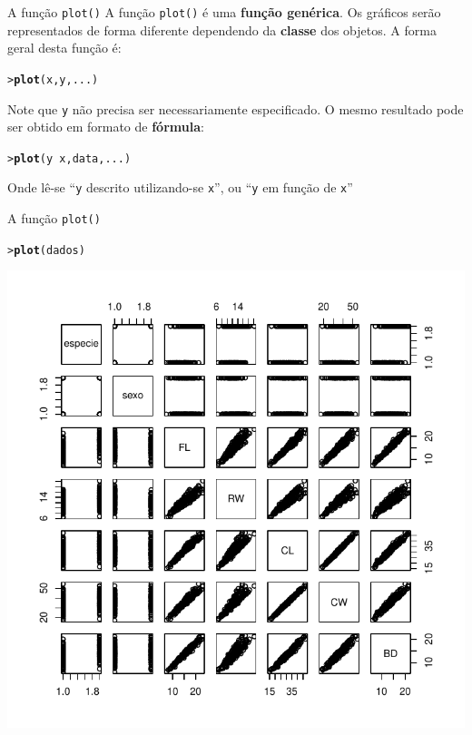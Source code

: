 \documentclass[10pt]{beamer}\usepackage[]{graphicx}\usepackage[]{color}
\makeatletter
\newcommand{\hlopt}[1]{\textcolor[rgb]{0,0,0}{#1}}%
\newcommand{\hlstd}[1]{\textcolor[rgb]{0.345,0.345,0.345}{#1}}%
\newcommand{\hlkwd}[1]{\textcolor[rgb]{0.282,0.239,0.545}{\textbf{#1}}}%
\newenvironment{kframe}{%
 \def\at@end@of@kframe{}%
 \ifinner\ifhmode%
  \def\at@end@of@kframe{\end{minipage}}%
  \begin{minipage}{\columnwidth}%
 \fi\fi%
 \def\FrameCommand##1{\hskip\@totalleftmargin \hskip-\fboxsep
 \colorbox{shadecolor}{##1}\hskip-\fboxsep
     \hskip-\linewidth \hskip-\@totalleftmargin \hskip\columnwidth}%
 \MakeFramed {\advance\hsize-\width
   \@totalleftmargin\z@ \linewidth\hsize
   \@setminipage}}%
 {\par\unskip\endMakeFramed%
 \at@end@of@kframe}
\newenvironment{knitrout}{}{} %
\makeatother
\begin{document}
\begin{frame}[fragile=singleslide]{A função \texttt{plot()}}
A função \texttt{plot()} é uma \textbf{função genérica}. Os gráficos serão
representados de forma diferente dependendo da \textbf{classe} dos
objetos. A forma geral desta função é:
\begin{knitrout}\small
{}\color{fgcolor}\begin{kframe}
\begin{alltt}
\hlstd{> }\hlkwd{plot}\hlstd{(x, y, ...)}
\end{alltt}
\end{kframe}
\end{knitrout}

Note que \texttt{y} não precisa ser necessariamente especificado. O
mesmo resultado pode ser obtido em formato de \textbf{fórmula}:
\begin{knitrout}\small
{}\color{fgcolor}\begin{kframe}
\begin{alltt}
\hlstd{> }\hlkwd{plot}\hlstd{(y} \hlopt{~} \hlstd{x, data, ...)}
\end{alltt}
\end{kframe}
\end{knitrout}

Onde lê-se ``\texttt{y} descrito utilizando-se \texttt{x}'', ou
``\texttt{y} em função de \texttt{x}''
\end{frame}

\begin{frame}[fragile=singleslide]{A função \texttt{plot()}}
\begin{knitrout}\small
{}\color{fgcolor}\begin{kframe}
\begin{alltt}
\hlstd{> }\hlkwd{plot}\hlstd{(dados)}
\end{alltt}
\end{kframe}

{\centering \includegraphics[width=.7\textwidth]{figure/unnamed-chunk-25} 

}



\end{knitrout}

\end{frame}
\end{document}
